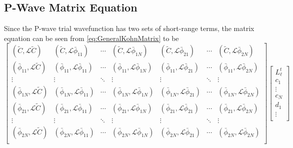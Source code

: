 \documentclass[Dissertation.tex]{subfiles}
\begin{document}
\subsection{P-Wave Matrix Equation}
\label{sec:PWaveMatrix}

Since the P-wave trial wavefunction has two sets of short-range terms, the matrix equation can be seen from \cref{eq:GeneralKohnMatrix} to be
{\small
\begin{equation}
\label{eq:PWaveKohnMatrix}
	\begin{bmatrix} 
	 (\widetilde{C},\mathcal{L}\widetilde{C}) & (\widetilde{C},\mathcal{L}\bar{\phi}_{11}) & \cdots & (\widetilde{C},\mathcal{L}\bar{\phi}_{1N}) & (\widetilde{C},\mathcal{L}\bar{\phi}_{21}) & \cdots & (\widetilde{C},\mathcal{L}\bar{\phi}_{2N})\\
	 (\bar{\phi}_{11},\mathcal{L}\widetilde{C}) & (\bar{\phi}_{11},\mathcal{L}\bar{\phi}_{11}) & \cdots & (\bar{\phi}_{11},\mathcal{L}\bar{\phi}_{1N}) & (\bar{\phi}_{11},\mathcal{L}\bar{\phi}_{21}) & \cdots & (\bar{\phi}_{11},\mathcal{L}\bar{\phi}_{2N})\\
	 \vdots & \vdots & \ddots & \vdots & \vdots & \ddots & \vdots \\
	 (\bar{\phi}_{1N},\mathcal{L}\widetilde{C}) & (\bar{\phi}_{1N},\mathcal{L}\bar{\phi}_{11}) & \cdots & (\bar{\phi}_{1N},\mathcal{L}\bar{\phi}_{1N}) & (\bar{\phi}_{1N},\mathcal{L}\bar{\phi}_{21}) & \cdots & (\bar{\phi}_{1N},\mathcal{L}\bar{\phi}_{2N})\\
	 (\bar{\phi}_{21},\mathcal{L}\widetilde{C}) & (\bar{\phi}_{21},\mathcal{L}\bar{\phi}_{11}) & \cdots & (\bar{\phi}_{21},\mathcal{L}\bar{\phi}_{1N}) & (\bar{\phi}_{21},\mathcal{L}\bar{\phi}_{21}) & \cdots & (\bar{\phi}_{21},\mathcal{L}\bar{\phi}_{2N})\\
	 \vdots & \vdots & \ddots & \vdots & \vdots & \ddots & \vdots \\
	 (\bar{\phi}_{2N},\mathcal{L}\widetilde{C}) & (\bar{\phi}_{2N},\mathcal{L}\bar{\phi}_{11}) & \cdots & (\bar{\phi}_{2N},\mathcal{L}\bar{\phi}_{1N}) & (\bar{\phi}_{2N},\mathcal{L}\bar{\phi}_{21}) & \cdots & (\bar{\phi}_{2N},\mathcal{L}\bar{\phi}_{2N})\\
	\end{bmatrix}
	\begin{bmatrix}
  L_\ell^t\\
	c_1\\
	\vdots\\
	c_N\\
	d_1\\
	\vdots\\

\end{bmatrix}
\end{equation}}
\end{document}

